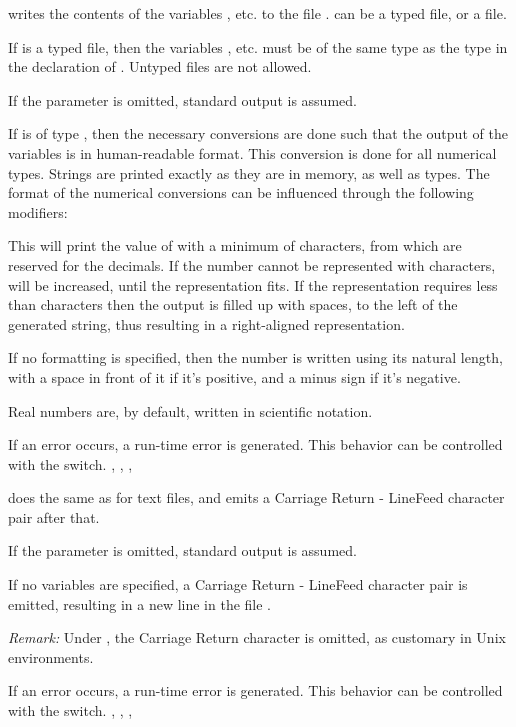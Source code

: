 \documentclass{report}
\begin{document}
{ writes the contents of the variables ,  etc. to
the file .  can be a typed file, or a  file.

If  is a typed file, then the variables ,  etc. must
be of the same type as the type in the declaration of . Untyped files
are not allowed.

If the parameter  is omitted, standard output is assumed. 

If  is of type , then the necessary conversions are done
such that the output of the variables is in human-readable format.
This conversion is done for all numerical types. Strings are printed exactly
as they are in memory, as well as  types. 
The format of the numerical conversions can be influenced through
the following modifiers:


This will print the value of  with a minimum of
 characters, from which  are reserved for the
decimals. If the number cannot be represented with  characters,
 will be increased, until the representation fits. If the
representation requires less than  characters then the output
is filled up with spaces, to the left of the generated string, thus
resulting in a right-aligned representation.

If no formatting is specified, then the number is written using its natural
length, with a space in front of it if it's positive, and a minus sign if
it's negative.

Real numbers are, by default, written in scientific notation.
}
{If an error occurs, a run-time error is generated. This behavior can be
controlled with the  switch. }
{, , ,  }

\procedure{WriteLn}{[([Var F : Text;] [V1 [; V2; ... , Vn)]]}
{ does the same as  for text files, and emits a
Carriage Return - LineFeed character pair after that.

If the parameter  is omitted, standard output is assumed. 

If no variables are specified, a Carriage Return - LineFeed character pair
is emitted, resulting in a new line in the file .

{\em Remark:} Under \linux, the Carriage Return character is omitted, as
customary in Unix environments.
}
{If an error occurs, a run-time error is generated. This behavior can be
controlled with the  switch. }
{, , , }

\html{}

%
% 
\printindex
\end{document}
